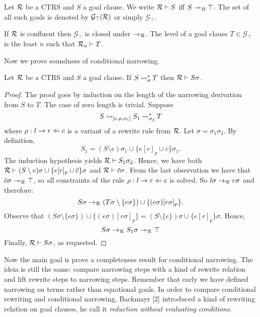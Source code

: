\begin{definition}
    Let $\mathcal{R}$ be a CTRS and $S$ a goal clause. We write $\mathcal{R} \vdash S$ iff $S \twoheadrightarrow_R \top$. The set of all such goals is denoted by $\mathcal{G}_\top(\mathcal{R})$ or simply $\mathcal{G}_\top$.
\end{definition}

If $\mathcal{R}$ is confluent then $\mathcal{G}_\top$ is closed under $\rightarrow_{\mathcal{R}}$. The level of a goal clause $T \in \mathcal{G}_\top$ is the least $n$ such that $\mathcal{R}_n \vdash T$.

Now we prove soundness of conditional narrowing.

\begin{theorem}
    Let $\mathcal{R}$ be a CTRS and $S$ a goal clause. If $S \mathbin{\rightsquigarrow}_\sigma^* T$ then $\mathcal{R} \vdash S \sigma$.
    \begin{proof}
        The proof goes by induction on the length of the narrowing derivation from $S$ to $T$. The case of zero length is trivial. Suppose
        $$S \mathbin{\rightsquigarrow}_{[e, \rho, \sigma_1]} S_1 \mathbin{\rightsquigarrow}_{\sigma_2}^* T$$
        where $\rho : l \rightarrow r \Leftarrow c$ is a variant of a rewrite rule from $\mathcal{R}$. Let $\sigma = \sigma_1 \sigma_2$. By definition,
        $$S_1 = (S \setminus {e})\sigma_1 \cup \{ e[r]_p \cup \overline{c} \}\sigma_1.$$
        The induction hypothesis yields $\mathcal{R} \vdash S_1 \sigma_2$. Hence, we have both $\mathcal{R} \vdash (S \setminus {e}) \sigma \cup \{e[r]_p \cup \overline{c} \}\sigma$ and $\mathcal{R} \vdash \overline{c} \sigma$. From the last observation we have that $\overline{c}\sigma \twoheadrightarrow_{\mathcal{R}} \top$, so all constraints of the rule $\rho : l \rightarrow r \Leftarrow c$ is solved. So $l\sigma \rightarrow_{\mathcal{R}} r \sigma$ and therefore:
        $$S \sigma \rightarrow_{\mathcal{R}} (T \sigma \setminus \{ e\sigma \}) \cup \{ (e\sigma)[r\sigma]_p \}.$$
        Observe that $(S \sigma \setminus \{ e\sigma \}) \cup \{ (e\sigma)[r\sigma]_p \} = (S \setminus \{e\})\sigma \cup \{ e[r]_p \}\sigma$. Hence,
        $$S \sigma \rightarrow_{\mathcal{R}} S_1\sigma \twoheadrightarrow_{\mathcal{R}} \top$$
        Finally, $\mathcal{R} \vdash S \sigma$, as requested.
    \end{proof}
\end{theorem}

Now the main goal is prove a completeness result for conditional narrowing. The ideia is still the same: compare narrowing steps with a kind of rewrite relation and lift rewrite steps to narrowing steps. Remember that early we have defined narrowing on terms rather than equational goals. In order to compare conditional rewriting and conditional narrowing, Backmayr [2] introduced a kind of rewriting relation on goal clauses, he call it \textit{reduction without evaluating conditions}.

